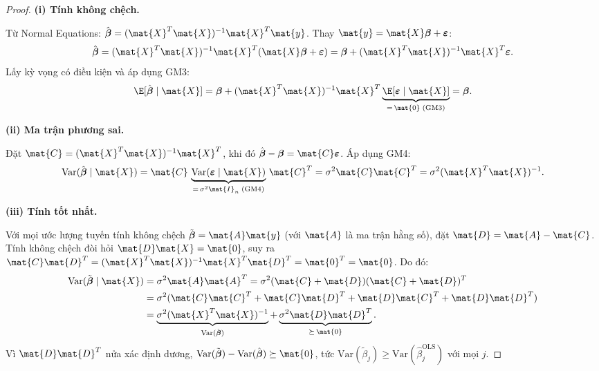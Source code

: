 \begin{proof}
\textbf{(i) Tính không chệch.}

Từ Normal Equations: $\hat{\boldsymbol{\beta}} = (\mat{X}^T\mat{X})^{-1}\mat{X}^T\mat{y}$.
Thay $\mat{y} = \mat{X}\boldsymbol{\beta} + \boldsymbol{\varepsilon}$:
\[
    \hat{\boldsymbol{\beta}}
    = (\mat{X}^T\mat{X})^{-1}\mat{X}^T(\mat{X}\boldsymbol{\beta} + \boldsymbol{\varepsilon})
    = \boldsymbol{\beta} + (\mat{X}^T\mat{X})^{-1}\mat{X}^T\boldsymbol{\varepsilon}.
\]
Lấy kỳ vọng có điều kiện và áp dụng GM3:
\[
    \E[\hat{\boldsymbol{\beta}} \mid \mat{X}]
    = \boldsymbol{\beta}
      + (\mat{X}^T\mat{X})^{-1}\mat{X}^T
        \underbrace{\E[\boldsymbol{\varepsilon} \mid \mat{X}]}_{=\,\mat{0}\;\text{(GM3)}}
    = \boldsymbol{\beta}.
\]

\medskip
\noindent\textbf{(ii) Ma trận phương sai.}

Đặt $\mat{C} = (\mat{X}^T\mat{X})^{-1}\mat{X}^T$, khi đó
$\hat{\boldsymbol{\beta}} - \boldsymbol{\beta} = \mat{C}\boldsymbol{\varepsilon}$.
Áp dụng GM4:
\[
    \mathrm{Var}(\hat{\boldsymbol{\beta}} \mid \mat{X})
    = \mat{C}\,\underbrace{\mathrm{Var}(\boldsymbol{\varepsilon} \mid \mat{X})}_{=\,\sigma^2\mat{I}_n\;\text{(GM4)}}\,\mat{C}^T
    = \sigma^2\mat{C}\mat{C}^T
    = \sigma^2(\mat{X}^T\mat{X})^{-1}.
\]

\medskip
\noindent\textbf{(iii) Tính tốt nhất.}

Với mọi ước lượng tuyến tính không chệch $\tilde{\boldsymbol{\beta}} = \mat{A}\mat{y}$
(với $\mat{A}$ là ma trận hằng số), đặt $\mat{D} = \mat{A} - \mat{C}$.
Tính không chệch đòi hỏi $\mat{D}\mat{X} = \mat{0}$, suy ra
$\mat{C}\mat{D}^T = (\mat{X}^T\mat{X})^{-1}\mat{X}^T\mat{D}^T = \mat{0}^T = \mat{0}$. Do đó:
\begin{align*}
    \mathrm{Var}(\tilde{\boldsymbol{\beta}} \mid \mat{X})
    &= \sigma^2\mat{A}\mat{A}^T
     = \sigma^2(\mat{C} + \mat{D})(\mat{C} + \mat{D})^T \\
    &= \sigma^2(\mat{C}\mat{C}^T + \mat{C}\mat{D}^T + \mat{D}\mat{C}^T + \mat{D}\mat{D}^T) \\
    &= \underbrace{\sigma^2(\mat{X}^T\mat{X})^{-1}}_{\mathrm{Var}(\hat{\boldsymbol{\beta}})}
       + \underbrace{\sigma^2\mat{D}\mat{D}^T}_{\succeq\,\mat{0}}.
\end{align*}
Vì $\mat{D}\mat{D}^T$ nửa xác định dương,
$\mathrm{Var}(\tilde{\boldsymbol{\beta}}) - \mathrm{Var}(\hat{\boldsymbol{\beta}}) \succeq \mat{0}$,
tức $\mathrm{Var}(\tilde{\beta}_j) \geq \mathrm{Var}(\hat{\beta}_j^{\mathrm{OLS}})$ với mọi $j$.
\end{proof}

